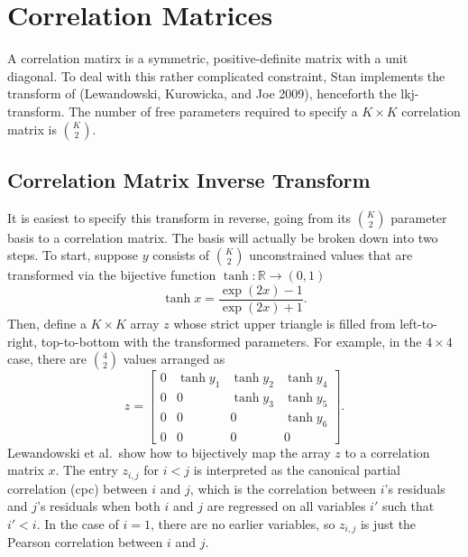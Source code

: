 \documentclass[10pt]{report}
\newcommand{\Stan}{Stan\xspace}
\newcommand{\acronym}[1]{{\sc #1}\xspace}
\newcommand{\LKJ}{\acronym{lkj}}
\newcommand{\CPC}{\acronym{cpc}}
\newcommand{\reals}{\mathbb{R}}
\begin{document}
\section{Correlation Matrices}

A correlation matirx is a symmetric, positive-definite matrix with a
unit diagonal.  To deal with this rather complicated constraint, \Stan
implements the transform of (Lewandowski, Kurowicka, and Joe 2009),
henceforth the \LKJ-transform.  The number of free parameters required
to specify a $K \times K$ correlation matrix is $K \choose 2$.

\subsection{Correlation Matrix Inverse Transform}

It is easiest to specify this transform in reverse, going from its $K
\choose 2$ parameter basis to a correlation matrix.  The basis will
actually be broken down into two steps.  To start, suppose $y$
consists of $K \choose 2$ unconstrained values that are transformed via
the bijective function $\tanh : \reals \rightarrow (0,1)$ 
%
\[
\tanh x = \frac{\exp(2x) - 1}{\exp(2x) + 1}.
\]
%
Then, define a $K \times K$ array $z$ whose strict upper triangle is 
filled from left-to-right, top-to-bottom with the transformed parameters.
For example, in the $4 \times 4$ case, there are ${4 \choose 2}$ values
arranged as
%
\[
z 
=
\left[
\begin{array}{cccc}
0 & \tanh y_1 & \tanh y_2 & \tanh y_4
\\
0 & 0 & \tanh y_3 & \tanh y_5
\\
0 & 0 & 0 & \tanh y_6
\\
0 & 0 & 0 & 0
\end{array}
\right]
.
\]
%
Lewandowski et al.\ show how to bijectively map the array $z$ to a correlation
matrix $x$.  The entry $z_{i,j}$ for $i < j$ is interpreted as the
canonical partial correlation (\CPC) between $i$ and $j$, which is the
correlation between $i$'s residuals and $j$'s residuals when both $i$
and $j$ are regressed on all variables $i'$ such that $i'< i$.
In the case of $i=1$, there are no earlier variables, 
so $z_{i,j}$ is just the Pearson correlation between $i$ and $j$.
\end{document}
